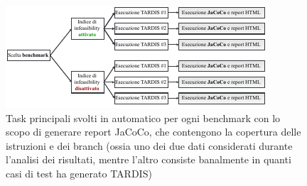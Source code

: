 \documentclass[a4paper, 12pt, oneside]{book}
\theoremstyle{normal}
\begin{document}
\begin{figure}[h]
  \centering
  \includegraphics[width=\textwidth]{img/benchmark-diagram.pdf}
  \caption{Task principali svolti in automatico per ogni benchmark con lo scopo di generare report JaCoCo, che contengono la copertura delle istruzioni e dei branch (ossia uno dei due dati considerati durante l'analisi dei risultati, mentre l'altro consiste banalmente in quanti casi di test ha generato TARDIS)}
  \label{diagram:benchmark}
\end{figure}
\end{document}
